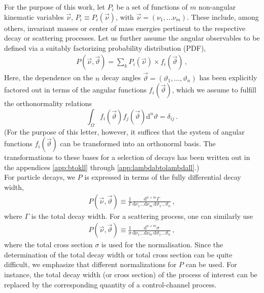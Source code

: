 \documentclass[aps,prd,reprint,nofootinbib,preprintnumbers]{revtex4}
\newcommand{\dd}{\text{d}}
\newcommand{\nuvec}{\vec{\nu}}
\newcommand{\thvec}{\vec{\vartheta}}
\renewcommand{\theta}{\vartheta}
\begin{document}
For the purpose of this work, let $P_i$ be a set of functions of $m$ non-angular
kinematic variables $\nuvec$, $P_i \equiv P_i(\nuvec)$, with $\nuvec = (\nu_1, \dots \nu_m)$.
These include, among others, invariant masses or center of mass energies pertinent
to the respective decay or scattering processes. Let us further assume the angular
observables to be defined via a suitably factorizing probability distribution (PDF),
\begin{align}
    \label{eq:def-P}
    P(\nuvec, \thvec) = \sum_k P_i(\nuvec) \times f_i(\thvec)\,,
\end{align}
Here, the dependence on the $n$ decay angles $\thvec = (\theta_1, \dots, \theta_n)$ has been
explicitly factored out in terms of the angular functions $f_i(\thvec)$, which we assume to fulfill the
orthonormality relations
\begin{equation}
    \label{eq:def-ortho-rel}
    \int_\Omega f_i(\thvec) f_j(\thvec) \dd^n \theta = \delta_{ij}\,.
\end{equation}
(For the purpose of this letter, however, it suffices that the system of angular
functions $f_i(\thvec)$ can be transformed into an orthonorml basis. The transformations to these
bases for a selection of decays has been written out in the appendices \ref{app:btokll} through
\ref{app:lambdabtolambdall}.)\\


For particle decays, we $P$ is expressed in terms of the fully differential decay width,
\begin{align}
    \label{eq:def-P-decay}
    P(\nuvec, \thvec) \equiv \frac{1}{\Gamma}\frac{\dd^{n+m}\Gamma}{\dd \nu_1 \dots \dd \nu_m\, \dd \theta_1 \dots \theta_n}\,,
\end{align}
where $\Gamma$ is the total decay width. For a scattering process, one can similarly use
\begin{align}
    \label{eq:def-P-scattering}
    P(\nuvec, \thvec) \equiv \frac{1}{\sigma}\frac{\dd^{n+m}\sigma}{\dd \nu_1 \dots \dd \nu_m\, \dd \theta_1 \dots \theta_n}\,,
\end{align}
where the total cross section $\sigma$ is used for the normalisation. Since the determination of
the total decay width or total cross section can be quite difficult, we emphasize that different normalizations for
$P$ can be used. For instance, the total decay width (or cross section) of the process of interest can be replaced
by the corresponding quantity of a control-channel process.\\
\end{document}
